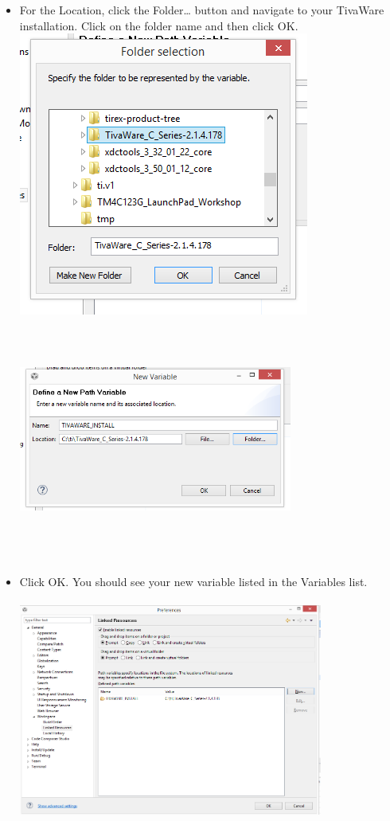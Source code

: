 \documentclass[a4paper,12pt,oneside]{article}
\begin{document}
\begin{itemize}
						\item For the Location, click
						the Folder… button and
						navigate to your TivaWare
						installation. Click on the
						folder name and then click
						OK.\\
						\includegraphics{Images/AddVariables4}\\
						\includegraphics[width=9cm, height=8cm]{Images/AddVariables5}
						\item Click OK. You should see your new variable listed in the Variables list.\\
						\includegraphics[width=10cm, height=8cm]{Images/AddVariables6}
					\end{itemize}
\end{document}
